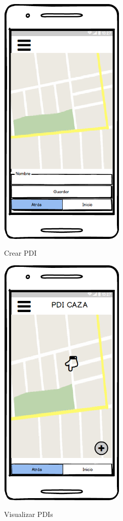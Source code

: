 	















	\begin{figure}[htbp]
\begin{minipage}[b]{0.5\linewidth} %
\centering
\includegraphics[width=6cm]{maqueta/pdi1.png}
 \label{figura1}
\caption{Crear PDI}

\end{minipage}
\hspace{0.5cm} %
\begin{minipage}[b]{0.5\linewidth}
\centering
\includegraphics[width=6cm]{maqueta/pdi2.png}
 \label{figura2}
\caption{Visualizar PDIs}

\end{minipage}
\end{figure}
	

